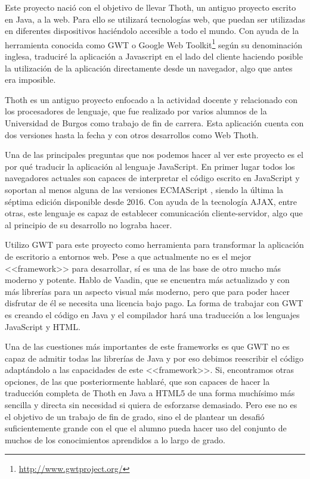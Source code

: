 
Este proyecto nació con el objetivo de llevar Thoth\cite{garcia2007ensenanza}, un antiguo proyecto escrito en Java, a la web. Para ello se utilizará tecnologías web, que puedan ser utilizadas en diferentes dispositivos haciéndolo accesible a todo el mundo. Con ayuda de la herramienta conocida como GWT o Google Web Toolkit\footnote{\url{http://www.gwtproject.org/}} según su denominación inglesa, traduciré la aplicación a Javascript en el lado del cliente haciendo posible la utilización de la aplicación directamente desde un navegador, algo que antes era imposible.

Thoth\cite{garcia2007ensenanza}
 es un antiguo proyecto enfocado a la actividad docente y relacionado con los procesadores de lenguaje, que fue realizado por varios alumnos de la Universidad de Burgos como trabajo de fin de carrera. Esta aplicación cuenta con dos versiones  hasta la fecha y con otros desarrollos como Web Thoth\cite{jute2017}.

Una de las principales preguntas que nos podemos hacer al ver este proyecto es el por qué traducir la aplicación al lenguaje JavaScript. 
En primer lugar todos los navegadores actuales son capaces de interpretar el código escrito en JavaScript y soportan al menos alguna de las versiones ECMAScript \cite{ecma:versiones}, siendo la última la séptima edición disponible desde 2016. Con ayuda de la tecnología AJAX, entre otras, este lenguaje es capaz de establecer comunicación cliente-servidor, algo que al principio de su desarrollo no lograba hacer. 

Utilizo GWT para este proyecto como herramienta para transformar la aplicación de escritorio a entornos web. Pese a que actualmente no es el mejor <<framework>> para desarrollar, sí es una de las base de otro mucho más moderno y potente. Hablo de Vaadin, que se encuentra más actualizado y con más librerías para un aspecto visual más moderno, pero que para poder hacer disfrutar de él se necesita una licencia bajo pago. La forma de trabajar con GWT es creando el código en Java y el compilador hará una traducción a los lenguajes JavaScript y HTML.

Una de las cuestiones más importantes de este frameworks es que GWT no es capaz de admitir todas las librerías de Java y por eso debimos reescribir el código adaptándolo a las capacidades de este <<framework>>. Si, encontramos otras opciones, de las que posteriormente hablaré, que son capaces de hacer la traducción completa de Thoth en Java a HTML5 de una forma muchísimo más sencilla y directa sin necesidad si quiera de esforzarse demasiado. Pero ese no es el objetivo de un trabajo de fin de grado, sino el de plantear un desafió suficientemente grande con el que el alumno pueda hacer uso del conjunto de muchos de los conocimientos aprendidos a lo largo de grado.